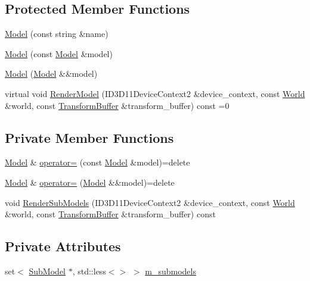 \subsection*{Protected Member Functions}
\begin{DoxyCompactItemize}
\item 
\hyperlink{classmage_1_1_model_adc37cc2030a93cde5da20f9a941c060e}{Model} (const string \&name)
\item 
\hyperlink{classmage_1_1_model_ac5f1d340bbfefd30bec3e6343a86059a}{Model} (const \hyperlink{classmage_1_1_model}{Model} \&model)
\item 
\hyperlink{classmage_1_1_model_a71abc57cde3bd6270de88bfa3aa47601}{Model} (\hyperlink{classmage_1_1_model}{Model} \&\&model)
\item 
virtual void \hyperlink{classmage_1_1_model_a2e455bf2998946d776b4056568a1c816}{Render\+Model} (I\+D3\+D11\+Device\+Context2 \&device\+\_\+context, const \hyperlink{classmage_1_1_world}{World} \&world, const \hyperlink{structmage_1_1_transform_buffer}{Transform\+Buffer} \&transform\+\_\+buffer) const =0
\end{DoxyCompactItemize}
\subsection*{Private Member Functions}
\begin{DoxyCompactItemize}
\item 
\hyperlink{classmage_1_1_model}{Model} \& \hyperlink{classmage_1_1_model_a563515c64ec39cfcda9f6ca37576391b}{operator=} (const \hyperlink{classmage_1_1_model}{Model} \&model)=delete
\item 
\hyperlink{classmage_1_1_model}{Model} \& \hyperlink{classmage_1_1_model_a084e30d15822bfefa79128f30a57cc02}{operator=} (\hyperlink{classmage_1_1_model}{Model} \&\&model)=delete
\item 
void \hyperlink{classmage_1_1_model_a8a713de6576beeeed5c28168b1f233e0}{Render\+Sub\+Models} (I\+D3\+D11\+Device\+Context2 \&device\+\_\+context, const \hyperlink{classmage_1_1_world}{World} \&world, const \hyperlink{structmage_1_1_transform_buffer}{Transform\+Buffer} \&transform\+\_\+buffer) const
\end{DoxyCompactItemize}
\subsection*{Private Attributes}
\begin{DoxyCompactItemize}
\item 
set$<$ \hyperlink{classmage_1_1_sub_model}{Sub\+Model} $\ast$, std\+::less$<$$>$ $>$ \hyperlink{classmage_1_1_model_a86c68c03650c206afa9c0a0b09a849e3}{m\+\_\+submodels}
\end{DoxyCompactItemize}


